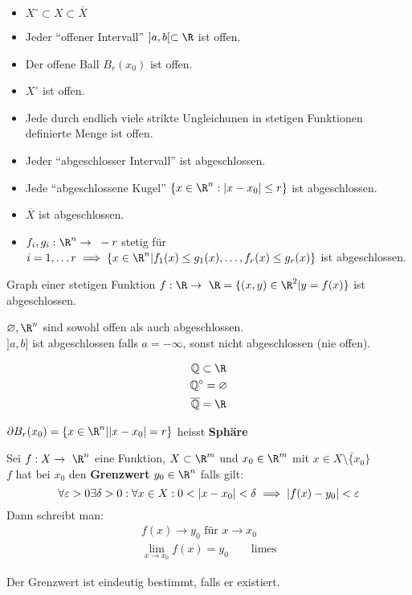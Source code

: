 \begin{bem}
	\begin{itemize}
		\item $X^\circ \subset X \subset \overline{X}$
		
		\item Jeder \enquote{offener Intervall} $]a,b[ \subset \R$ ist offen.
		\item Der offene Ball $B_r(x_0)$ ist offen.
		\item $X^\circ$ ist offen.
		\item Jede durch endlich viele strikte Ungleichunen in stetigen Funktionen definierte Menge ist offen.
		
		\item Jeder \enquote{abgeschlosser Intervall} ist abgeschlossen.
		\item Jede \enquote{abgeschlossene Kugel} $\{ x \in \R^n : \abs{x-x_0} \leq r \}$ ist abgeschlossen.
		\item $\overline{X}$ ist abgeschlossen.
		\item $f_i, g_i: \R^n \rightarrow -r$ stetig für $i = 1, \dotsc r \implies \{ x \in \R^n | f_1(x) \leq g_1(x), \dotsc , f_r(x) \leq g_r(x) \}$ ist abgeschlossen.
	\end{itemize}
\end{bem}
\begin{bsp*}
	Graph einer stetigen Funktion $f: \R \rightarrow \R = \{ (x,y) \in \R^2 | y = f(x) \}$ ist abgeschlossen.
\end{bsp*}
\begin{bem}
	$\varnothing, \R^n$ sind sowohl offen als auch abgeschlossen.\\
	$]a,b]$ ist abgeschlossen falls $a = -\infty$, sonst nicht abgeschlossen (nie offen).
\end{bem}
\begin{bsp*}
	\begin{gather*}
		\Q \subset \R \\
		\Q^\circ = \varnothing \\
		\overline{\Q} = \R
	\end{gather*}
\end{bsp*}
\begin{bem}
	$\partial B_r(x_0) = \{ x \in \R^n | \abs{x-x_0} = r \}$ heisst \textbf{Sphäre}
\end{bem}
\begin{def*}[note = Grenzwert , index = Grenzwert]
	Sei $f: X \rightarrow \R^n$ eine Funktion, $X \subset \R^m$ und $x_0 \in \R^m$ mit $x \in \overline{X \setminus \{ x_0 \}}$\\
	$f$ hat bei $x_0$ den \textbf{Grenzwert} $y_0 \in \R^n$ falls gilt:
	\[ \forall \epsilon > 0 \exists \delta > 0 : \forall x \in X : 0 < \abs{x-x_0} < \delta \implies \abs{f(x) - y_0} < \epsilon \]
	Dann schreibt man:
	\begin{gather*}
		f(x) \rightarrow y_0 \text{ für } x \rightarrow x_0 \\
		\lim_{x \rightarrow x_0} f(x) = y_0 \qquad \text{limes}
	\end{gather*}
	\begin{bem}
		Der Grenzwert ist eindeutig bestimmt, falls er existiert.
	\end{bem}
\end{def*}
